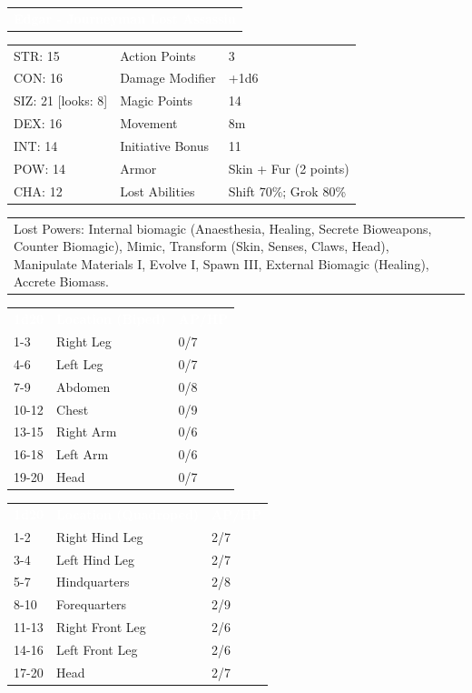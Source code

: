 \documentclass[letterpaper,serif]{rpg-module}
\begin{document}
\noindent\begin{tabularx}{\linewidth}{X}
\rowcolor{gray}
\textcolor{white}{\textbf{Edgar - Journeyman Lost Assassin}}
\end{tabularx}
\begin{tabularx}{\linewidth}{XXX}
STR: 15 & Action Points & 3 \\
CON: 16 & Damage Modifier & +1d6 \\
SIZ: 21 [looks: 8] & Magic Points & 14 \\
DEX: 16 & Movement & 8m \\
INT: 14 & Initiative Bonus & 11 \\
POW: 14 & Armor & Skin + Fur (2 points) \\
CHA: 12 & Lost Abilities & Shift 70\%; Grok 80\% \\
\end{tabularx}
\begin{tabularx}{\linewidth}{XXX}
Lost Powers: Internal biomagic (Anaesthesia, Healing, Secrete Bioweapons, Counter Biomagic), Mimic, Transform (Skin, Senses, Claws, Head), Manipulate Materials I, Evolve I, Spawn III, External Biomagic (Healing), Accrete Biomass. 
\end{tabularx}

\begin{tabularx}{\linewidth}{XXX}
\rowcolor{gray}
\textcolor{white}{\textbf{1d20}} & \textcolor{white}{\textbf{Location (Biped)}} & \textcolor{white}{\textbf{AP/HP}} \\
1-3 & Right Leg & 0/7 \\
4-6 & Left Leg & 0/7 \\
7-9 & Abdomen & 0/8 \\
10-12 & Chest & 0/9 \\
13-15 & Right Arm & 0/6 \\
16-18 & Left Arm & 0/6 \\
19-20 & Head & 0/7 
\end{tabularx}

\begin{tabularx}{\linewidth}{XXX}
\rowcolor{gray}
\textcolor{white}{\textbf{1d20}} & \textcolor{white}{\textbf{Location (Quadroped)}} & \textcolor{white}{\textbf{AP/HP}} \\
1-2 & Right Hind Leg & 2/7 \\
3-4 & Left Hind Leg & 2/7 \\
5-7 & Hindquarters & 2/8 \\
8-10 & Forequarters & 2/9 \\
11-13 & Right Front Leg & 2/6 \\
14-16 & Left Front Leg & 2/6 \\
17-20 & Head & 2/7 
\end{tabularx}
\end{document}
